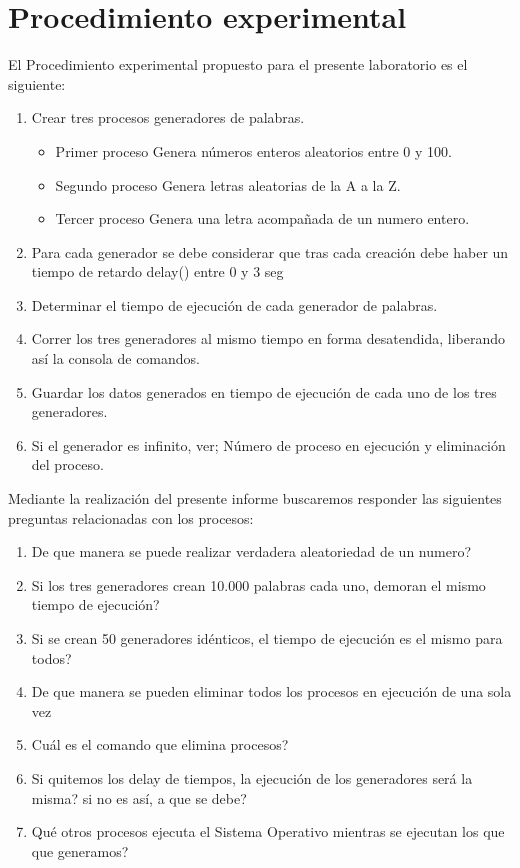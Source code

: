 \section{Procedimiento experimental}
El Procedimiento experimental propuesto para el presente laboratorio es el siguiente:

\begin{enumerate}
    \item Crear tres procesos generadores de palabras.
    \begin{itemize}
        \item Primer proceso Genera números enteros aleatorios entre 0 y 100.
        \item Segundo proceso Genera letras aleatorias de la A a la Z.
        \item Tercer proceso Genera una letra acompañada de un numero entero.
    \end{itemize}
    \item Para cada generador se debe considerar que tras cada creación debe haber un tiempo de retardo delay() entre 0 y 3 seg
    \item Determinar el tiempo de ejecución de cada generador de palabras.
    \item Correr los tres generadores al mismo tiempo en forma desatendida, liberando así  la consola de comandos.
    \item Guardar los datos generados en tiempo de ejecución de cada uno de los tres generadores.
    \item Si el generador es infinito, ver; Número de proceso en ejecución y eliminación del proceso.
\end{enumerate}

Mediante la realización del presente informe buscaremos responder las siguientes preguntas relacionadas con los procesos:
\begin{enumerate}
    \item De que manera se puede realizar verdadera aleatoriedad de un numero?
    \item Si los tres generadores crean 10.000 palabras cada uno, demoran el mismo tiempo de ejecución?
    \item Si se crean 50 generadores idénticos, el tiempo de ejecución es el mismo para todos?
    \item De que manera se pueden eliminar todos los procesos en ejecución de una sola vez
    \item Cuál es el comando que elimina procesos?
    \item Si quitemos los delay de tiempos, la ejecución de los generadores será la misma?  si no es así, a que se debe?
    \item Qué otros procesos ejecuta el Sistema Operativo mientras se ejecutan los que que generamos?
\end{enumerate}
